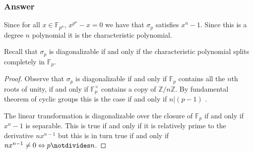 \documentclass[10pt]{article}
\begin{document}
\subsubsection{Answer}
Since for all $x \in \mathbb{F}_{p^n}$, $x^{p^n}-x=0$ we have that $\sigma_p$ satisfies $x^n-1$. Since this is a degree $n$ polynomial it is the characteristic polynomial. 

Recall  that $\sigma_p$ is diagonalizable if and only if the characteristic polynomial splits completely in $\mathbb{F}_p$. 

\begin{proof} Observe that $\sigma_p$ is diagonalizable if and only if $\mathbb{F}_p$ contains all the $n$th roots of unity, if and only if $\mathbb{F}^\times_p$ contains a copy of $\mathbb{Z}/n\mathbb{Z}$. By fundamental theorem of cyclic groups this is the case if and only if $n|(p-1)$ .

The linear transformation is diagonalizable over the closure of $\mathbb{F}_p$ if and only if $x^n-1$ is separable. This is true if and only if it is relatively prime to the derivative $nx^{n-1}$ but this is in turn true if and only if $nx^{n-1}\neq 0 \Leftrightarrow p\notdivides n$.\end{proof}
\end{document}
